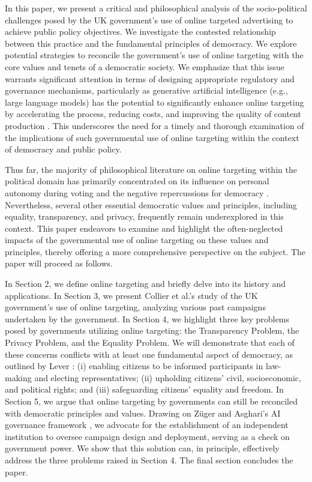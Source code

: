 \documentclass[preprint]{acmart}
\begin{document}
In this paper, we present a critical and philosophical analysis of the socio-political challenges posed by the UK government's use of online targeted advertising to achieve public policy objectives. We investigate the contested relationship between this practice and the fundamental principles of democracy. We explore potential strategies to reconcile the government's use of online targeting with the core values and tenets of a democratic society. We emphasize that this issue warrants significant attention in terms of designing appropriate regulatory and governance mechanisms, particularly as generative artificial intelligence (e.g., large language models) has the potential to significantly enhance online targeting by accelerating the process, reducing costs, and improving the quality of content production \cite{weidinger2022taxonomy}. This underscores the need for a timely and thorough examination of the implications of such governmental use of online targeting within the context of democracy and public policy.



Thus far, the majority of philosophical literature on online targeting within the political domain has primarily concentrated on its influence on personal autonomy during voting and the negative repercussions for democracy \cite{Susserand2019, Susser20192, zuiderveen2018, barnhill}. Nevertheless, several other essential democratic values and principles, including equality, transparency, and privacy, frequently remain underexplored in this context. This paper endeavors to examine and highlight the often-neglected impacts of the governmental use of online targeting on these values and principles, thereby offering a more comprehensive perspective on the subject. The paper will proceed as follows.

In Section 2, we define online targeting and briefly delve into its history and applications. In Section 3, we present Collier et al.'s study \cite{Collier2022} of the UK government's use of online targeting, analyzing various past campaigns undertaken by the government. In Section 4, we highlight three key problems posed by governments utilizing online targeting: the Transparency Problem, the Privacy Problem, and the Equality Problem. We will demonstrate that each of these concerns conflicts with at least one fundamental aspect of democracy, as outlined by Lever \cite{lever2006}: (i) enabling citizens to be informed participants in law-making and electing representatives; (ii) upholding citizens' civil, socioeconomic, and political rights; and (iii) safeguarding citizens' equality and freedom. In Section 5, we argue that online targeting by governments can still be reconciled with democratic principles and values. Drawing on Züger and Asghari's AI governance framework \cite{zuger2022}, we advocate for the establishment of an independent institution to oversee campaign design and deployment, serving as a check on government power. We show that this solution can, in principle, effectively address the three problems raised in Section 4. The final section concludes the paper. 
\end{document}
